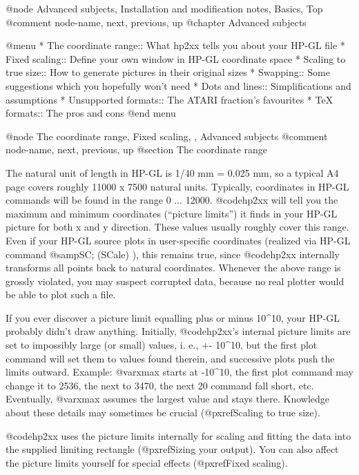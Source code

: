 @node Advanced subjects, Installation and modification notes, Basics, Top
@comment  node-name,  next,  previous,  up
@chapter Advanced subjects

@menu
* The coordinate range:: What hp2xx tells you about your HP-GL file
* Fixed scaling::        Define your own window in HP-GL coordinate space
* Scaling to true size:: How to generate pictures in their original sizes
* Swapping::             Some suggestions which you hopefully won't need
* Dots and lines::       Simplifications and assumptions
* Unsupported formats::  The ATARI fraction's favourites
* TeX formats::          The pros and cons
@end menu

@node The coordinate range, Fixed scaling, , Advanced subjects
@comment  node-name,  next,  previous,  up
@section The coordinate range

The natural unit of length in HP-GL is 1/40 mm = 0.025 mm, so a typical
A4 page covers roughly 11000 x 7500 natural units. Typically, coordinates in
HP-GL commands will be found in the range 0 ... 12000. @code{hp2xx} will tell
you the maximum and minimum coordinates (``picture limits'')
it finds in your HP-GL picture for both x and y direction.
These values usually roughly cover this range.
Even if your HP-GL source plots in user-specific coordinates (realized
via HP-GL command @samp{SC;} (SCale) ), this remains true, since
@code{hp2xx} internally transforms all points back to natural coordinates.
Whenever the above range is grossly violated, you may suspect corrupted
data, because no real plotter would be able to plot such a file.

If you ever discover a picture limit equalling plus or minus 10^10,
your HP-GL probably didn't draw anything. Initially, @code{hp2xx}'s internal
picture limits are set to impossibly large (or small) values, i. e., +- 10^10,
but the first plot command will set them to values found therein, and successive
plots push the limits outward. Example: @var{xmax} starts at -10^10,
the first plot command may change it to 2536, the next to 3470, the next
20 command fall short, etc. Eventually, @var{xmax} assumes the largest
value and stays there. Knowledge about these details may sometimes
be crucial (@pxref{Scaling to true size}).

@code{hp2xx} uses the picture limits internally for scaling and fitting the
data into the supplied  limiting rectangle (@pxref{Sizing your output}).
You can also affect the picture limits yourself for special effects
(@pxref{Fixed scaling}).



